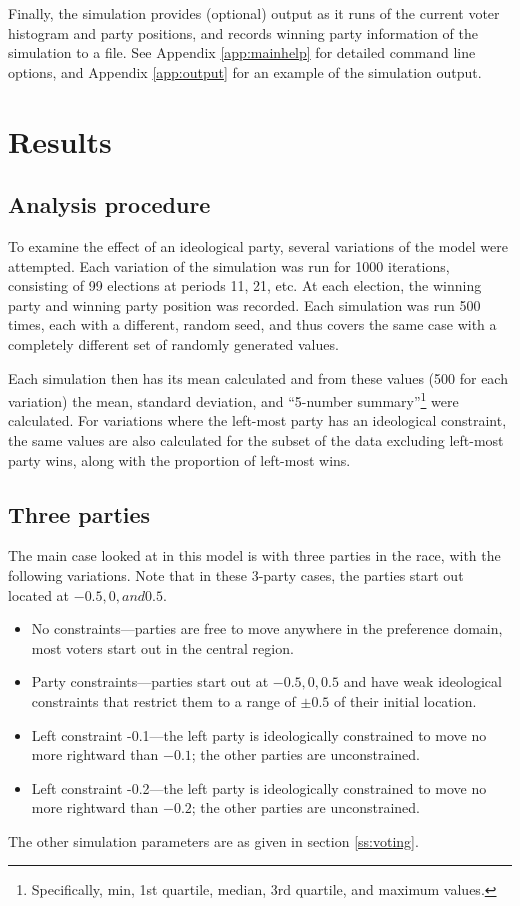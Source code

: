 \documentclass[12pt]{article}
\numberwithin{equation}{subsection}
\begin{document}
Finally, the simulation provides (optional) output as it runs of the current voter histogram and
party positions, and records winning party information of the simulation to a file.  See Appendix
\ref{app:mainhelp} for detailed command line options, and Appendix \ref{app:output} for an example of the
simulation output.

\section{Results}\label{s:results}

\subsection{Analysis procedure}

To examine the effect of an ideological party, several variations of the model were attempted.
Each variation of the simulation was run for 1000 iterations, consisting of 99 elections at periods
11, 21, etc.  At each election, the winning party and winning party position was recorded.  Each
simulation was run 500 times, each with a different, random seed, and thus covers the same case with
a completely different set of randomly generated values.

Each simulation then has its mean calculated and from these values (500 for each variation) the
mean, standard deviation, and ``5-number summary''\footnote{
    Specifically, min, 1st quartile, median, 3rd quartile, and maximum values.
} were calculated.  For variations where the left-most party has an ideological constraint, the same
values are also calculated for the subset of the data excluding left-most party wins, along with the
proportion of left-most wins.

\subsection{Three parties}

The main case looked at in this model is with three parties in the race, with the following
variations.  Note that in these 3-party cases, the parties start out located at $-0.5, 0, and 0.5$.
\begin{itemize}
    \item No constraints---parties are free to move anywhere in the preference
        domain, most voters start out in the central region.
    \item Party constraints---parties start out at $-0.5, 0, 0.5$ and have weak ideological
        constraints that restrict them to a range of $\pm 0.5$ of their initial location.
    \item Left constraint -0.1---the left party is ideologically constrained to move no more
        rightward than $-0.1$; the other parties are unconstrained.
    \item Left constraint -0.2---the left party is ideologically constrained to move no more
        rightward than $-0.2$; the other parties are unconstrained.
\end{itemize}
The other simulation parameters are as given in section \ref{ss:voting}.
\end{document}
